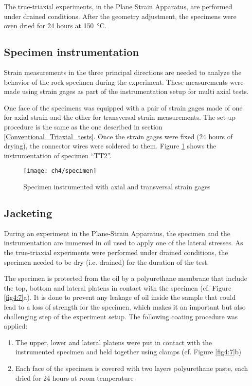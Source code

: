 The true-triaxial experiments, in the Plane Strain Apparatus, are performed under drained conditions. After the geometry adjustment, the specimens were oven dried for 24 hours at \SI{150}{\celsius}.

\subsection{Specimen instrumentation}

Strain measurements in the three principal directions are needed to analyze the behavior of the rock specimen during the experiment. These measurements were made using strain gages as part of the instrumentation setup for multi axial tests. 

One face of the specimens was equipped with a pair of strain gages made of one for axial strain and the other for transversal strain measurements. The set-up procedure is the same as the one described in section \ref{Conventional_Triaxial_tests}. Once the strain gages were fixed (24 hours of drying), the connector wires were soldered to them. Figure \ref{fig4:6} shows the instrumentation of specimen “TT2”.  

\begin{figure}[tb]
    \centering
    \texttt{[image: ch4/specimen]}
    \caption{Specimen instrumented with axial and transversal strain gages}
    \label{fig4:6}
\end{figure} 

\subsection{Jacketing}

During an experiment in the Plane-Strain Apparatus, the specimen and the instrumentation are immersed in oil used to apply one of the lateral stresses. As the true-triaxial experiments were performed under drained conditions, the specimen needed to be dry (i.e. drained) for the duration of the test. 

The specimen is protected from the oil by a polyurethane membrane that include the top, bottom and lateral platens in contact with the specimen (cf. Figure \ref{fig4:7}a). It is done to prevent any leakage of oil inside the sample that could lead to a loss of strength for the specimen, which makes it an important but also challenging step of the experiment setup. The following coating procedure was applied: 

\begin{enumerate}
    \item The upper, lower and lateral platens were put in contact with the instrumented specimen and held together using clamps (cf. Figure \ref{fig4:7}b)
    \item Each face of the specimen is covered with two layers polyurethane paste, each dried for 24 hours at room temperature
\end{enumerate}

